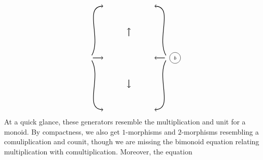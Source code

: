\documentclass[11pt]{amsart}
\theoremstyle{remark}
\theoremstyle{definition}
\begin{document}
\[{\begin{tikzpicture}[scale=0.95]
\begin{scope}
\node [style=circle,draw=black] at (2.4,1) {\scriptsize $b$};
\end{scope}
\node (v1) at (-2,1) {};
\node (v2) at (-1.2,1) {};
\draw [thick,->]  (v1) edge (v2);
\node (v3) at (2,1) {};
\node (v4) at (1.2,1) {};
\draw [thick,->] (v3) edge (v4);
\node (v14) at (0,2) {};
\node (v15) at (0,2.7) {};
\draw [thick,->] (v14) edge (v15);
\node (v16) at (0,0) {};
\node (v17) at (0,-0.7) {};
\draw [thick,->] (v16) edge (v17);
\node (v18) at (-1.2,3.7) {};
\node (v19) at (-1.2,-1.7) {};
\draw [thick,->] (v1) edge [in=180, out=60] (v18);
\draw [thick,->] (v1) edge [in=180, out=-60] (v19);
\node (v20) at (1.2,3.7) {};
\node (v21) at (1.2,-1.7) {};
\draw [thick,->](v3) edge [in=0, out=120] (v20);
\draw [thick,->] (v3) edge [in=0, out=-120] (v21);
\end{tikzpicture}
}
\] 
At a quick glance, 
these generators resemble 
the multiplication and 
unit for a monoid. 
By compactness, we also
get $1$-morphisms and 
$2$-morphisms resembling a
comuliplication and counit, 
though we are missing
the bimonoid equation relating
multiplication with comultiplication.
Moreover, the equation
\end{document}
